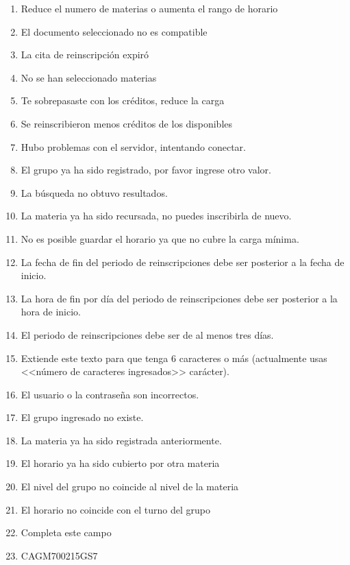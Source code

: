 \begin{enumerate}[{ME} 1.]
\item Reduce el numero de materias o aumenta el rango de horario
\item El documento seleccionado no es compatible
\item La cita de reinscripción expiró
\item No se han seleccionado materias
\item Te sobrepasaste con los créditos, reduce la carga
\item Se reinscribieron menos créditos de los disponibles
\item Hubo problemas con el servidor, intentando conectar.
\item El grupo ya ha sido registrado, por favor ingrese otro valor.
\item La búsqueda no obtuvo resultados.
\item La materia ya ha sido recursada, no puedes inscribirla de nuevo.
\item No es posible guardar el horario ya que no cubre la carga mínima.
\item La fecha de fin del periodo de reinscripciones debe ser posterior a la fecha de inicio.
\item La hora de fin por día del periodo de reinscripciones debe ser posterior a la hora de inicio.
\item El periodo de reinscripciones debe ser de al menos tres días.
\item Extiende este texto para que tenga 6 caracteres o más (actualmente usas <<número de caracteres ingresados>> carácter).
\item El usuario o la contraseña son incorrectos.
\item El grupo ingresado no existe.
\item La materia ya ha sido registrada anteriormente.
\item El horario ya ha sido cubierto por otra materia
\item El nivel del grupo no coincide al nivel de la materia
\item El horario no coincide con el turno del grupo
\item Completa este campo
\item CAGM700215GS7
\end{enumerate}
